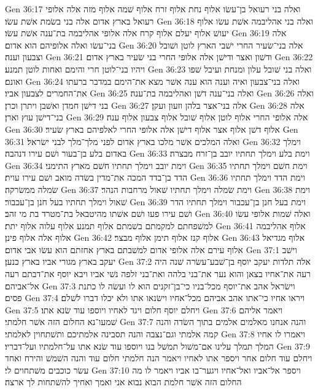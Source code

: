 Gen 36:17  ואלה בני רעואל בן־עשׂו אלוף נחת אלוף זרח אלוף שׁמה אלוף מזה אלה אלופי רעואל בארץ אדום אלה בני בשׂמת אשׁת עשׂו׃
Gen 36:18  ואלה בני אהליבמה אשׁת עשׂו אלוף יעושׁ אלוף יעלם אלוף קרח אלה אלופי אהליבמה בת־ענה אשׁת עשׂו׃
Gen 36:19  אלה בני־עשׂו ואלה אלופיהם הוא אדום׃
Gen 36:20  אלה בני־שׂעיר החרי ישׁבי הארץ לוטן ושׁובל וצבעון וענה׃
Gen 36:21  ודשׁון ואצר ודישׁן אלה אלופי החרי בני שׂעיר בארץ אדום׃
Gen 36:22  ויהיו בני־לוטן חרי והימם ואחות לוטן תמנע׃
Gen 36:23  ואלה בני שׁובל עלון ומנחת ועיבל שׁפו ואונם׃
Gen 36:24  ואלה בני־צבעון ואיה וענה הוא ענה אשׁר מצא את־הימם במדבר ברעתו את־החמרים לצבעון אביו׃
Gen 36:25  ואלה בני־ענה דשׁן ואהליבמה בת־ענה׃
Gen 36:26  ואלה בני דישׁן חמדן ואשׁבן ויתרן וכרן׃
Gen 36:27  אלה בני־אצר בלהן וזעון ועקן׃
Gen 36:28  אלה בני־דישׁן עוץ וארן׃
Gen 36:29  אלה אלופי החרי אלוף לוטן אלוף שׁובל אלוף צבעון אלוף ענה׃
Gen 36:30  אלוף דשׁן אלוף אצר אלוף דישׁן אלה אלופי החרי לאלפיהם בארץ שׂעיר׃
Gen 36:31  ואלה המלכים אשׁר מלכו בארץ אדום לפני מלך־מלך לבני ישׂראל׃
Gen 36:32  וימלך באדום בלע בן־בעור ושׁם עירו דנהבה׃
Gen 36:33  וימת בלע וימלך תחתיו יובב בן־זרח מבצרה׃
Gen 36:34  וימת יובב וימלך תחתיו חשׁם מארץ התימני׃
Gen 36:35  וימת חשׁם וימלך תחתיו הדד בן־בדד המכה את־מדין בשׂדה מואב ושׁם עירו עוית׃
Gen 36:36  וימת הדד וימלך תחתיו שׂמלה ממשׂרקה׃
Gen 36:37  וימת שׂמלה וימלך תחתיו שׁאול מרחבות הנהר׃
Gen 36:38  וימת שׁאול וימלך תחתיו בעל חנן בן־עכבור׃
Gen 36:39  וימת בעל חנן בן־עכבור וימלך תחתיו הדר ושׁם עירו פעו ושׁם אשׁתו מהיטבאל בת־מטרד בת מי זהב׃
Gen 36:40  ואלה שׁמות אלופי עשׂו למשׁפחתם למקמתם בשׁמתם אלוף תמנע אלוף עלוה אלוף יתת׃
Gen 36:41  אלוף אהליבמה אלוף אלה אלוף פינן׃
Gen 36:42  אלוף קנז אלוף תימן אלוף מבצר׃
Gen 36:43  אלוף מגדיאל אלוף עירם אלה אלופי אדום למשׁבתם בארץ אחזתם הוא עשׂו אבי אדום׃
Gen 37:1  וישׁב יעקב בארץ מגורי אביו בארץ כנען׃
Gen 37:2  אלה תלדות יעקב יוסף בן־שׁבע־עשׂרה שׁנה היה רעה את־אחיו בצאן והוא נער את־בני בלהה ואת־בני זלפה נשׁי אביו ויבא יוסף את־דבתם רעה אל־אביהם׃
Gen 37:3  וישׂראל אהב את־יוסף מכל־בניו כי־בן־זקנים הוא לו ועשׂה לו כתנת פסים׃
Gen 37:4  ויראו אחיו כי־אתו אהב אביהם מכל־אחיו וישׂנאו אתו ולא יכלו דברו לשׁלם׃
Gen 37:5  ויחלם יוסף חלום ויגד לאחיו ויוספו עוד שׂנא אתו׃
Gen 37:6  ויאמר אליהם שׁמעו־נא החלום הזה אשׁר חלמתי׃
Gen 37:7  והנה אנחנו מאלמים אלמים בתוך השׂדה והנה קמה אלמתי וגם־נצבה והנה תסבינה אלמתיכם ותשׁתחוין לאלמתי׃
Gen 37:8  ויאמרו לו אחיו המלך תמלך עלינו אם־משׁול תמשׁל בנו ויוספו עוד שׂנא אתו על־חלמתיו ועל־דבריו׃
Gen 37:9  ויחלם עוד חלום אחר ויספר אתו לאחיו ויאמר הנה חלמתי חלום עוד והנה השׁמשׁ והירח ואחד עשׂר כוכבים משׁתחוים לי׃
Gen 37:10  ויספר אל־אביו ואל־אחיו ויגער־בו אביו ויאמר לו מה החלום הזה אשׁר חלמת הבוא נבוא אני ואמך ואחיך להשׁתחות לך ארצה׃
